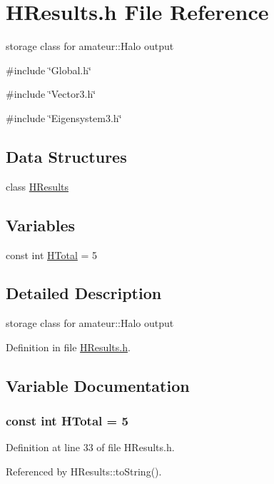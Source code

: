 \section{HResults.h File Reference}
\label{HResults_8h}


storage class for amateur::Halo output  


{\ttfamily \#include \char`\"{}Global.h\char`\"{}}\par
{\ttfamily \#include \char`\"{}Vector3.h\char`\"{}}\par
{\ttfamily \#include \char`\"{}Eigensystem3.h\char`\"{}}\par
\subsection*{Data Structures}
\begin{DoxyCompactItemize}
\item 
class \hyperlink{classHResults}{HResults}
\end{DoxyCompactItemize}
\subsection*{Variables}
\begin{DoxyCompactItemize}
\item 
const int \hyperlink{HResults_8h_a647dddfc1458e8dada0bb36a259c9c9d}{HTotal} = 5
\end{DoxyCompactItemize}


\subsection{Detailed Description}
storage class for amateur::Halo output 

Definition in file \hyperlink{HResults_8h_source}{HResults.h}.



\subsection{Variable Documentation}
\subsubsection[{HTotal}]{\setlength{\rightskip}{0pt plus 5cm}const int {\bf HTotal} = 5}\label{HResults_8h_a647dddfc1458e8dada0bb36a259c9c9d}


Definition at line 33 of file HResults.h.



Referenced by HResults::toString().

